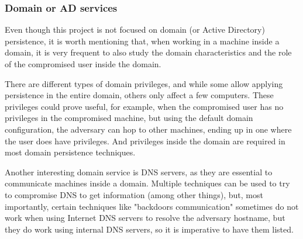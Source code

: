 
\subsubsection{Domain or AD services}
Even though this project is not focused on domain (or Active Directory) persistence, it is worth mentioning that, when working in a machine inside a domain, it is very frequent to also study the domain characteristics and the role of the compromised user inside the domain.

There are different types of domain privileges, and while some allow applying persistence in the entire domain, others only affect a few computers. These privileges could prove useful, for example, when the compromised user has no privileges in the compromised machine, but using the default domain configuration, the adversary can hop to other machines, ending up in one where the user does have privileges. And privileges inside the domain are required in most domain persistence techniques.

Another interesting domain service is DNS servers, as they are essential to communicate machines inside a domain. Multiple techniques can be used to try to compromise DNS to get information (among other things), but, most importantly, certain techniques like "backdoors communication" sometimes do not work when using Internet DNS servers to resolve the adversary hostname, but they do work using internal DNS servers, so it is imperative to have them listed.
